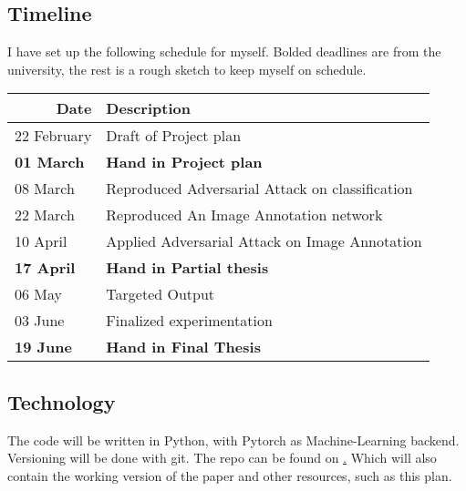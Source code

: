 \documentclass[12pt]{extarticle}
\begin{document}
\subsection{Timeline}
I have set up the following schedule for myself. Bolded deadlines are from the university, the rest is a rough sketch to keep myself on schedule.
\begin{table}[]
    \begin{tabular}{|l|l|}
        \hline
        \multicolumn{1}{|r|}{Date} & Description                                     \\ \hline
        22 February                & Draft of Project plan                           \\ \hline
        \textbf{01 March}          & \textbf{Hand in Project plan}                   \\ \hline
        08 March                   & Reproduced Adversarial Attack on classification \\ \hline
        22 March                   & Reproduced An Image Annotation network          \\ \hline
        10 April                   & Applied Adversarial Attack on Image Annotation  \\ \hline
        \textbf{17 April}          & \textbf{Hand in Partial thesis}                 \\ \hline
        06 May                     & Targeted Output                                 \\ \hline
        03 June                    & Finalized experimentation                       \\ \hline
        \textbf{19 June}           & \textbf{Hand in Final Thesis}                   \\ \hline
    \end{tabular}
\end{table}


\subsection{Technology}
The code will be written in Python, with Pytorch as Machine-Learning backend. Versioning will be done with git. The repo can be found on \href{https://github.com/dikvangenuchten/bep-adversarial-image-annotation}. Which will also contain the working version of the paper and other resources, such as this plan.




\end{document}
